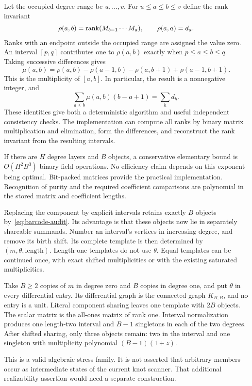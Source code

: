 Let the occupied degree range be $u,\ldots,v$. For $u\le a\le b\le v$
define the rank invariant
\begin{equation}\label{eq:rank-invariant}
 \rho(a,b)=\operatorname{rank}(M_{b-1}\cdots M_a),
 \qquad \rho(a,a)=d_a.
\end{equation}
Ranks with an endpoint outside the occupied range are assigned the value
zero. An interval $[p,q]$ contributes one to $\rho(a,b)$ exactly when
$p\le a\le b\le q$. Taking successive differences gives
\begin{equation}\label{eq:mobius-bars}
 \mu(a,b)=\rho(a,b)-\rho(a-1,b)
          -\rho(a,b+1)+\rho(a-1,b+1).
\end{equation}
This is the multiplicity of $[a,b]$. In particular, the result is a
nonnegative integer, and
\begin{equation}\label{eq:barcode-audit}
 \sum_{a\le b}\mu(a,b)(b-a+1)=\sum_h d_h.
\end{equation}
These identities give both a deterministic algorithm and useful
independent consistency checks. The implementation can compute all ranks
by binary matrix multiplication and elimination, form the differences,
and reconstruct the rank invariant from the resulting intervals.

If there are $H$ degree layers and $B$ objects, a conservative elementary
bound is $O(H^2B^3)$ binary field operations. No efficiency claim depends
on this exponent being optimal. Bit-packed matrices provide the practical
implementation. Recognition of purity and the required coefficient
comparisons are polynomial in the stored matrix and coefficient lengths.

Replacing the component by explicit intervals retains exactly $B$ objects
by~\eqref{eq:barcode-audit}. Its advantage is that these objects now lie
in separately shareable summands. Number an interval's vertices in
increasing degree, and remove its birth shift. Its complete template is
then determined by $(m,\theta,\text{length})$. Length-one templates do not
use $\theta$. Equal templates can be continued once, with exact shifted
multiplicities or with the existing saturated multiplicities.

\begin{example}
\label{ex:dense-pure}
Take $B\ge2$ copies of $m$ in degree zero and $B$ copies in degree one,
and put $\theta$ in every differential entry. Its differential graph is
the connected graph $K_{B,B}$, and no entry is a unit. Literal component
sharing leaves one template with $2B$ objects. The scalar matrix is the
all-ones matrix of rank one. Interval normalization produces one
length-two interval and $B-1$ singletons in each of the two degrees.
After shifted sharing, only three objects remain: two in the interval
and one singleton with multiplicity polynomial $(B-1)(1+z)$.

This is a valid algebraic stress family. It is not asserted that arbitrary
members occur as intermediate states of the current knot scanner. That
additional realizability assertion would need a separate construction.
\end{example}

